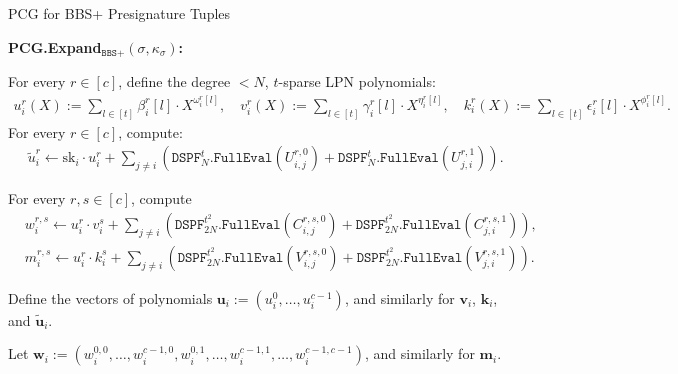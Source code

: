 \begin{specialconstruction}{PCG for BBS+ Presignature Tuples}
\vspace{1em} %

\textbf{PCG.Expand$_{\texttt{BBS+}}(\sigma, \kappa_\sigma)$:}

\begin{algorithmic}[1]
\State For every $r \in [c]$, define the degree $< N$, $t$-sparse LPN polynomials:
\begin{align*}
u_{i}^{r}(X):= \sum_{l \in [t]} \beta_{i}^{r}[l] \cdot X^{\omega_{i}^{r}[l]}, \quad  v_{i}^{r}(X):= \sum_{l \in [t]} \gamma_{i}^{r}[l] \cdot X^{\eta_{i}^{r}[l]}, \quad  k_{i}^{r}(X):= \sum_{l \in [t]} \epsilon_{i}^{r}[l] \cdot X^{\phi_{i}^{r}[l]}.
\end{align*}
\State For every $r \in [c]$, compute:
\begin{align*}
& \widetilde{u}_{i}^{r} \leftarrow \mathrm{sk}_{i} \cdot u_{i}^{r}+\sum_{j \neq i}\left(\texttt{DSPF}_{N}^{t}.\texttt{FullEval}\left(U_{i, j}^{r, 0}\right)+\texttt{DSPF}_{N}^{t}.\texttt{FullEval}\left(U_{j, i}^{r, 1}\right)\right).
\end{align*}

\State For every $r, s \in [c]$, compute
\begin{align*}
& w_{i}^{r, s} \leftarrow u_{i}^{r} \cdot v_{i}^{s}+\sum_{j \neq i}\left(\texttt{DSPF}_{2N}^{t^{2}}.\texttt{FullEval}\left(C_{i, j}^{r, s, 0}\right)+\texttt{DSPF}_{2N}^{t^{2}}.\texttt{FullEval}\left(C_{j, i}^{r, s, 1}\right)\right), \\
& m_{i}^{r, s} \leftarrow u_{i}^{r} \cdot k_{i}^{s}+\sum_{j \neq i}\left(\texttt{DSPF}_{2N}^{t^{2}}.\texttt{FullEval}\left(V_{i, j}^{r, s, 0}\right)+\texttt{DSPF}_{2N}^{t^{2}}.\texttt{FullEval}\left(V_{j, i}^{r, s, 1}\right)\right).
\end{align*}

\State Define the vectors of polynomials $\boldsymbol{u}_{i} := (u_{i}^{0}, \ldots, u_{i}^{c-1})$, and similarly for $\boldsymbol{v}_{i}$, $\boldsymbol{k}_{i}$, and $\widetilde{\boldsymbol{u}}_{i}$.

\State Let $\boldsymbol{w}_{i} := (w_{i}^{0,0}, \ldots, w_{i}^{c-1,0}, w_{i}^{0,1}, \ldots, w_{i}^{c-1,1}, \ldots, w_{i}^{c-1, c-1})$, and similarly for $\boldsymbol{m}_{i}$.


\end{algorithmic}
\end{specialconstruction}
